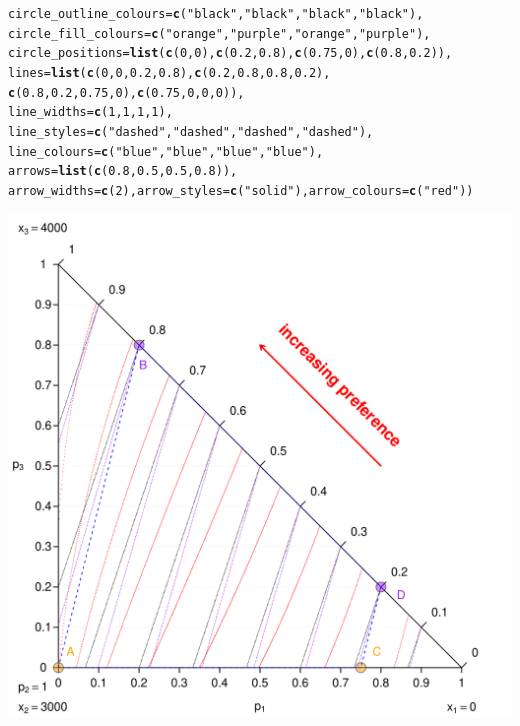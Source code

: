 \documentclass{article}\usepackage[]{graphicx}\usepackage[]{color}
\makeatletter
\newcommand{\hlnum}[1]{\textcolor[rgb]{0.686,0.059,0.569}{#1}}%
\newcommand{\hlstr}[1]{\textcolor[rgb]{0.192,0.494,0.8}{#1}}%
\newcommand{\hlstd}[1]{\textcolor[rgb]{0.345,0.345,0.345}{#1}}%
\newcommand{\hlkwc}[1]{\textcolor[rgb]{0.333,0.667,0.333}{#1}}%
\newcommand{\hlkwd}[1]{\textcolor[rgb]{0.737,0.353,0.396}{\textbf{#1}}}%
\newenvironment{kframe}{%
 \def\at@end@of@kframe{}%
 \ifinner\ifhmode%
  \def\at@end@of@kframe{\end{minipage}}%
  \begin{minipage}{\columnwidth}%
 \fi\fi%
 \def\FrameCommand##1{\hskip\@totalleftmargin \hskip-\fboxsep
 \colorbox{shadecolor}{##1}\hskip-\fboxsep
     \hskip-\linewidth \hskip-\@totalleftmargin \hskip\columnwidth}%
 \MakeFramed {\advance\hsize-\width
   \@totalleftmargin\z@ \linewidth\hsize
   \@setminipage}}%
 {\par\unskip\endMakeFramed%
 \at@end@of@kframe}
\newenvironment{knitrout}{}{} %
\makeatother
\begin{document}
\begin{knitrout}
\begin{kframe}
\begin{alltt}
        \hlkwc{circle_outline_colours}\hlstd{=}\hlkwd{c}\hlstd{(}\hlstr{"black"}\hlstd{,}\hlstr{"black"}\hlstd{,}\hlstr{"black"}\hlstd{,}\hlstr{"black"}\hlstd{),}
        \hlkwc{circle_fill_colours}\hlstd{=}\hlkwd{c}\hlstd{(}\hlstr{"orange"}\hlstd{,}\hlstr{"purple"}\hlstd{,}\hlstr{"orange"}\hlstd{,}\hlstr{"purple"}\hlstd{),}
        \hlkwc{circle_positions}\hlstd{=}\hlkwd{list}\hlstd{(}\hlkwd{c}\hlstd{(}\hlnum{0}\hlstd{,}\hlnum{0}\hlstd{),}\hlkwd{c}\hlstd{(}\hlnum{0.2}\hlstd{,}\hlnum{0.8}\hlstd{),}\hlkwd{c}\hlstd{(}\hlnum{0.75}\hlstd{,}\hlnum{0}\hlstd{),}\hlkwd{c}\hlstd{(}\hlnum{0.8}\hlstd{,}\hlnum{0.2}\hlstd{)),}
        \hlkwc{lines}\hlstd{=}\hlkwd{list}\hlstd{(}\hlkwd{c}\hlstd{(}\hlnum{0}\hlstd{,}\hlnum{0}\hlstd{,}\hlnum{0.2}\hlstd{,}\hlnum{0.8}\hlstd{),}\hlkwd{c}\hlstd{(}\hlnum{0.2}\hlstd{,}\hlnum{0.8}\hlstd{,}\hlnum{0.8}\hlstd{,}\hlnum{0.2}\hlstd{),}
                \hlkwd{c}\hlstd{(}\hlnum{0.8}\hlstd{,}\hlnum{0.2}\hlstd{,}\hlnum{0.75}\hlstd{,}\hlnum{0}\hlstd{),}\hlkwd{c}\hlstd{(}\hlnum{0.75}\hlstd{,}\hlnum{0}\hlstd{,}\hlnum{0}\hlstd{,}\hlnum{0}\hlstd{)),}
        \hlkwc{line_widths}\hlstd{=}\hlkwd{c}\hlstd{(}\hlnum{1}\hlstd{,} \hlnum{1}\hlstd{,} \hlnum{1}\hlstd{,} \hlnum{1}\hlstd{),}
        \hlkwc{line_styles}\hlstd{=}\hlkwd{c}\hlstd{(}\hlstr{"dashed"}\hlstd{,} \hlstr{"dashed"}\hlstd{,} \hlstr{"dashed"}\hlstd{,} \hlstr{"dashed"}\hlstd{),}
        \hlkwc{line_colours}\hlstd{=}\hlkwd{c}\hlstd{(}\hlstr{"blue"}\hlstd{,}\hlstr{"blue"}\hlstd{,}\hlstr{"blue"}\hlstd{,}\hlstr{"blue"}\hlstd{),}
        \hlkwc{arrows}\hlstd{=}\hlkwd{list}\hlstd{(}\hlkwd{c}\hlstd{(}\hlnum{0.8}\hlstd{,}\hlnum{0.5}\hlstd{,}\hlnum{0.5}\hlstd{,}\hlnum{0.8}\hlstd{)),}
        \hlkwc{arrow_widths}\hlstd{=}\hlkwd{c}\hlstd{(}\hlnum{2}\hlstd{),} \hlkwc{arrow_styles}\hlstd{=}\hlkwd{c}\hlstd{(}\hlstr{"solid"}\hlstd{),} \hlkwc{arrow_colours}\hlstd{=}\hlkwd{c}\hlstd{(}\hlstr{"red"}\hlstd{))}
\end{alltt}
\end{kframe}

{\centering \includegraphics[width=0.8\linewidth]{figure/unnamed-chunk-31} 

}



\end{knitrout}
\end{document}
